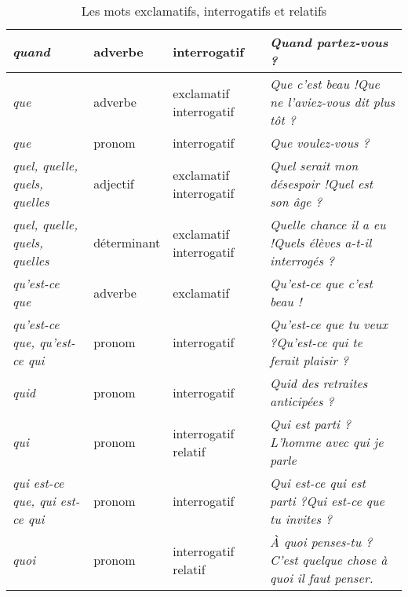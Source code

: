 \documentclass[UTF8]{report}
\begin{document}
\begin{table}[H]
\begin{tabular}{|>{\RaggedRight\arraybackslash}p{2.5cm}|l|>{\RaggedRight\arraybackslash}p{2cm}|>{\RaggedRight\arraybackslash}p{6.5cm}|}
\hline
\textit{quand} & adverbe & interrogatif & \textit{Quand partez-vous ?} \\
\hline
\textit{que} & adverbe & exclamatif \newline interrogatif & \textit{Que c'est beau !}\newline\textit{Que ne l'aviez-vous dit plus tôt ?} \\
\hline
\textit{que} & pronom & interrogatif & \textit{Que voulez-vous ?} \\
\hline
\textit{quel, quelle, quels, quelles} & adjectif & exclamatif \newline interrogatif & \textit{Quel serait mon désespoir !}\newline\textit{Quel est son âge ?} \\
\hline
\textit{quel, quelle, quels, quelles} & déterminant & exclamatif \newline interrogatif & \textit{Quelle chance il a eu !}\newline\textit{Quels élèves a-t-il interrogés ?} \\
\hline
\textit{qu'est-ce que} & adverbe & exclamatif & \textit{Qu'est-ce que c'est beau !} \\
\hline
\textit{qu'est-ce que, qu'est-ce qui} & pronom & interrogatif & \textit{Qu'est-ce que tu veux ?}\newline\textit{Qu'est-ce qui te ferait plaisir ?} \\
\hline
\textit{quid} & pronom & interrogatif & \textit{Quid des retraites anticipées ?} \\
\hline
\textit{qui} & pronom & interrogatif \newline relatif & \textit{Qui est parti ?}\newline\textit{L'homme avec qui je parle} \\
\hline
\textit{qui est-ce que, qui est-ce qui} & pronom & interrogatif & \textit{Qui est-ce qui est parti ?}\newline\textit{Qui est-ce que tu invites ?} \\
\hline
\textit{quoi} & pronom & interrogatif \newline relatif & \textit{À quoi penses-tu ?}\newline\textit{C'est quelque chose à quoi il faut penser.} \\
\hline
\end{tabular}
\caption{Les mots exclamatifs, interrogatifs et relatifs}
\end{table}
\end{document}
